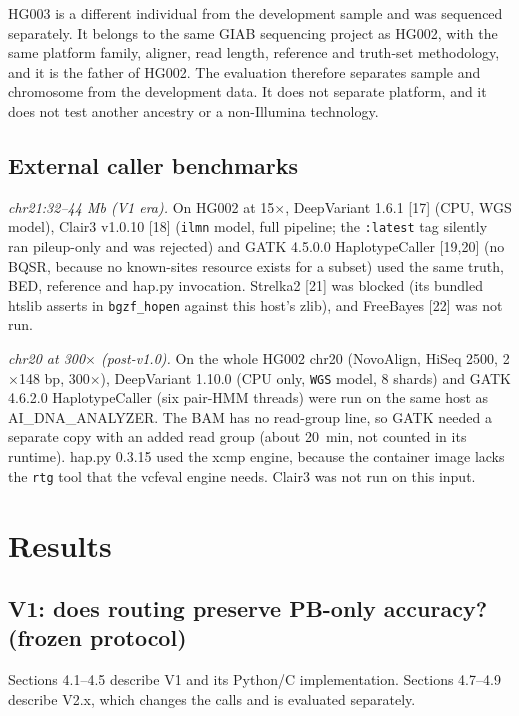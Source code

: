 \documentclass[11pt,a4paper]{article}
\makeatletter
\newcommand{\needspace}[1]{\par\ifdim\pagegoal=\maxdimen\else\dimen@=\pagegoal\advance\dimen@-\pagetotal\ifdim\dimen@<#1\relax\newpage\fi\fi}
\makeatother
\begin{document}
HG003 is a different individual from the development sample and was sequenced separately. It belongs to the same GIAB sequencing project as HG002, with the same platform family, aligner, read length, reference and truth-set methodology, and it is the father of HG002. The evaluation therefore separates sample and chromosome from the development data. It does not separate platform, and it does not test another ancestry or a non-Illumina technology.

\needspace{6\baselineskip}
\subsection{\texorpdfstring{External caller benchmarks}{External caller benchmarks}}
\emph{chr21:32--44 Mb (V1 era).} On HG002 at 15$\times$, DeepVariant 1.6.1 [17] (CPU, WGS model), Clair3 v1.0.10 [18] (\texttt{ilmn} model, full pipeline; the \texttt{:latest} tag silently ran pileup-only and was rejected) and GATK 4.5.0.0 HaplotypeCaller [19,20] (no BQSR, because no known-sites resource exists for a subset) used the same truth, BED, reference and hap.py invocation. Strelka2 [21] was blocked (its bundled htslib asserts in \texttt{bgzf\_\allowbreak{}hopen} against this host's zlib), and FreeBayes [22] was not run.

\emph{chr20 at 300$\times$ (post-v1.0).} On the whole HG002 chr20 (NovoAlign, HiSeq 2500, 2$\times$148 bp, 300$\times$), DeepVariant 1.10.0 (CPU only, \texttt{WGS} model, 8 shards) and GATK 4.6.2.0 HaplotypeCaller (six pair-HMM threads) were run on the same host as AI\_DNA\_ANALYZER. The BAM has no read-group line, so GATK needed a separate copy with an added read group (about 20~min, not counted in its runtime). hap.py 0.3.15 used the xcmp engine, because the container image lacks the \texttt{rtg} tool that the vcfeval engine needs. Clair3 was not run on this input.

\FloatBarrier
\needspace{10\baselineskip}
\section{\texorpdfstring{Results}{Results}}
\needspace{6\baselineskip}
\subsection{\texorpdfstring{V1: does routing preserve PB-only accuracy? (frozen protocol)}{V1: does routing preserve PB-only accuracy? (frozen protocol)}}
Sections 4.1--4.5 describe V1 and its Python/C implementation. Sections 4.7--4.9 describe V2.x, which changes the calls and is evaluated separately.
\end{document}
